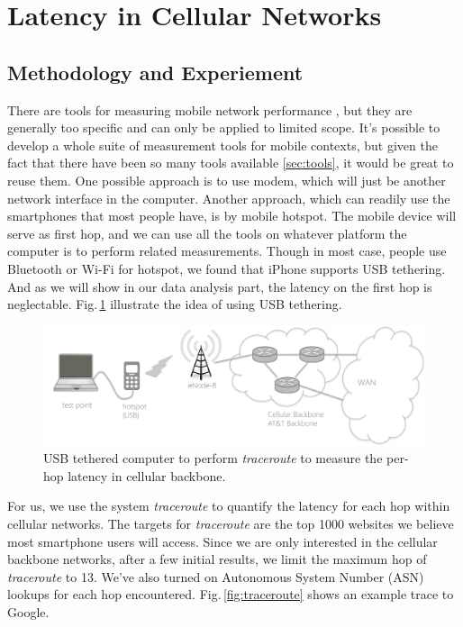 \section{Latency in Cellular Networks}

\subsection{Methodology and Experiement}
\label{sec:methodology}

There are tools for measuring mobile network performance \cite{speedtest, huang2011mobiperf}, but they are generally too specific and can only be applied to limited scope. It's possible to develop a whole suite of measurement tools for mobile contexts, but given the fact that there have been so many tools available \ref{sec:tools}, it would be great to reuse them. One possible approach is to use modem, which will just be another network interface in the computer. Another approach, which can readily use the smartphones that most people have, is by mobile hotspot. The mobile device will serve as first hop, and we can use all the tools on whatever platform the computer is to perform related measurements. Though in most case, people use Bluetooth or Wi-Fi for hotspot, we found that iPhone supports USB tethering. And as we will show in our data analysis part, the latency on the first hop is neglectable. Fig.\,\ref{fig:mobile_networks_method} illustrate the idea of using USB tethering.

\begin{figure}
  \centering
  \includegraphics[width=\linewidth]{../figs/mobile_networks_method.pdf}
  \vspace{-1em}
  \caption{USB tethered computer to perform {\it traceroute} to measure the per-hop latency in cellular backbone.}
  \label{fig:mobile_networks_method}
\end{figure}

For us, we use the system {\it traceroute} to quantify the latency for each hop within cellular networks. The targets for {\it traceroute} are the top 1000 websites we believe most smartphone users will access. Since we are only interested in the cellular backbone networks, after a few initial results, we limit the maximum hop of {\it traceroute} to 13. We've also turned on Autonomous System Number (ASN) lookups for each hop encountered. Fig.\,\ref{fig:traceroute} shows an example trace to Google.

